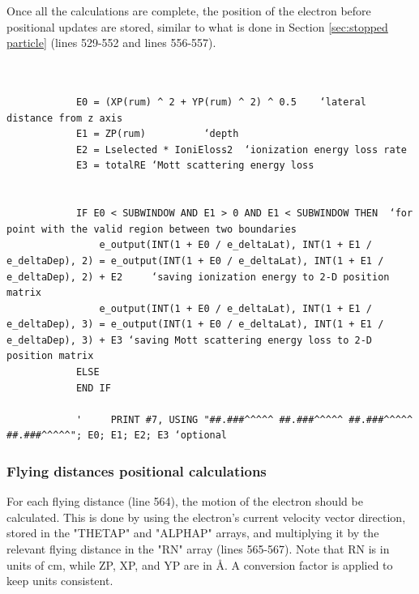 \documentclass[10pt, reqno]{exam}
\begin{document}
Once all the calculations are complete, the position of the electron before positional updates are stored, similar to what is done in Section \ref{sec:stopped particle} (lines 529-552 and lines 556-557). \par

\begin{verbatim}
    
    
            E0 = (XP(rum) ^ 2 + YP(rum) ^ 2) ^ 0.5    ‘lateral distance from z axis
            E1 = ZP(rum)          ‘depth                           
            E2 = Lselected * IoniEloss2  ‘ionization energy loss rate
            E3 = totalRE ‘Mott scattering energy loss
    
    
            IF E0 < SUBWINDOW AND E1 > 0 AND E1 < SUBWINDOW THEN  ‘for point with the valid region between two boundaries
                e_output(INT(1 + E0 / e_deltaLat), INT(1 + E1 / e_deltaDep), 2) = e_output(INT(1 + E0 / e_deltaLat), INT(1 + E1 / e_deltaDep), 2) + E2     ‘saving ionization energy to 2-D position matrix
                e_output(INT(1 + E0 / e_deltaLat), INT(1 + E1 / e_deltaDep), 3) = e_output(INT(1 + E0 / e_deltaLat), INT(1 + E1 / e_deltaDep), 3) + E3 ‘saving Mott scattering energy loss to 2-D position matrix
            ELSE
            END IF
    
            '     PRINT #7, USING "##.###^^^^^ ##.###^^^^^ ##.###^^^^^ ##.###^^^^^"; E0; E1; E2; E3 ‘optional
\end{verbatim}

\subsubsection{Flying distances positional calculations}

For each flying distance (line 564), the motion of the electron should be calculated. This is done by using the electron's current velocity vector direction, stored in the "THETAP" and "ALPHAP" arrays, and multiplying it by the relevant flying distance in the "RN" array (lines 565-567). Note that RN is in units of cm, while ZP, XP, and YP are in \si{\angstrom}. A conversion factor is applied to keep units consistent. \par

\end{document}
